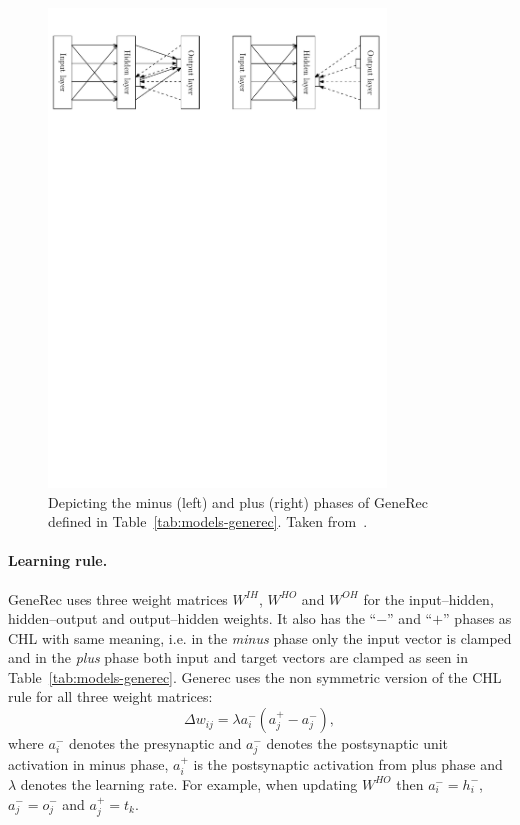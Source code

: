 \begin{figure}[H]
  \centering
  \includegraphics[width=0.8\textwidth]{img/models-generec-phase.pdf}
  
  \caption{Depicting the minus (left) and plus (right) phases of GeneRec defined in Table~\ref{tab:models-generec}. Taken from~\citet{orru2008sabio}.} 
  \label{fig:models-generec-phase}
\end{figure}

\paragraph{Learning rule.} 
\label{sec:models-generec-learning-rule} 
GeneRec uses three weight matrices $W^{IH}$, $W^{HO}$ and $W^{OH}$ for the input--hidden, hidden--output and output--hidden weights. It also has the ``$-$'' and ``$+$'' phases as CHL with same meaning, i.e. in the \emph{minus} phase only the input vector is clamped and in the \emph{plus} phase both input and target vectors are clamped as seen in Table~\ref{tab:models-generec}. Generec uses the non symmetric version of the CHL rule for all three weight matrices: 
\begin{equation}
  \label{eq:models-generec-learning-rule}
  \Delta w_{ij} = \lambda a^{-}_i(a^{+}_j - a^{-}_j),
\end{equation}
where $a^{-}_i$ denotes the presynaptic and $a^{-}_j$ denotes the postsynaptic unit activation in minus phase, $a^{+}_i$ is the postsynaptic activation from plus phase and $\lambda$ denotes the learning rate. For example, when updating $W^{HO}$ then $a^{-}_i = h^{-}_i$, $a^{-}_j = o^{-}_j$ and $a^{+}_j = t_k$. 


